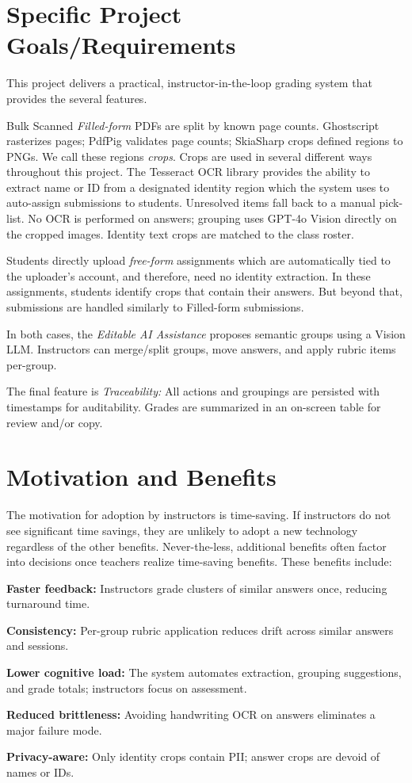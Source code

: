\documentclass[ms,twoside,print]{nuthesis}
\begin{document}
\section{Specific Project Goals/Requirements}
This project delivers a practical, instructor-in-the-loop grading system that provides the several features. 

Bulk Scanned \textit{Filled-form} PDFs are split by known page counts. Ghostscript rasterizes pages; PdfPig validates page counts; SkiaSharp crops defined regions to PNGs. We call these regions \textit{crops}. Crops are used in several different ways throughout this project. The Tesseract OCR library provides the ability to extract name or ID from a designated identity region which the system uses to auto-assign submissions to students. Unresolved items fall back to a manual pick-list. No OCR is performed on answers; grouping uses GPT-4o Vision directly on the cropped images. Identity text crops are matched to the class roster.

Students directly upload \textit{free-form} assignments which are automatically tied to the uploader's account, and therefore, need no identity extraction. In these assignments, students identify crops that contain their answers. But beyond that, submissions are handled similarly to Filled-form submissions. 

In both cases, the \textit{Editable AI Assistance} proposes semantic groups using a Vision LLM. Instructors can merge/split groups, move answers, and apply rubric items per-group.

The final feature is \textit{Traceability:} All actions and groupings are persisted with timestamps for auditability. Grades are summarized in an on-screen table for review and/or copy.

\section{Motivation and Benefits}

The motivation for adoption by instructors is time-saving. If instructors do not see significant time savings, they are unlikely to adopt a new technology regardless of the other benefits. Never-the-less, additional benefits often factor into decisions once teachers realize time-saving benefits. These benefits include:

\begin{compactitem}
  \item \textbf{Faster feedback:} Instructors grade clusters of similar answers once, reducing turnaround time.
  \item \textbf{Consistency:} Per-group rubric application reduces drift across similar answers and sessions.
  \item \textbf{Lower cognitive load:} The system automates extraction, grouping suggestions, and grade totals; instructors focus on assessment.
  \item \textbf{Reduced brittleness:} Avoiding handwriting OCR on answers eliminates a major failure mode.
  \item \textbf{Privacy-aware:} Only identity crops contain PII; answer crops are devoid of names or IDs.
\end{compactitem}
\end{document}
